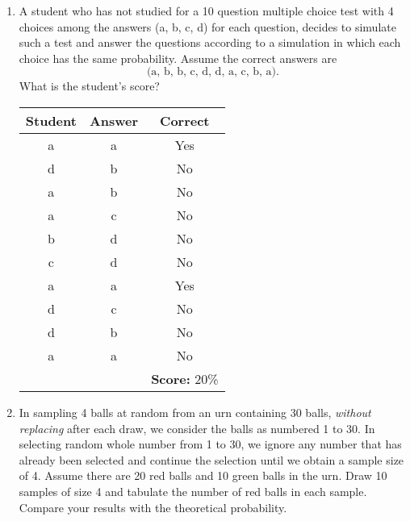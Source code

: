 \documentclass{hw}
\begin{document}
\begin{enumerate}
\newpage
\item A student who has not studied for a 10 question multiple choice test with 4 choices among the answers
(a, b, c, d) for each question, decides to simulate such a test and answer the questions according to a
simulation in which each choice has the same probability. Assume the correct answers are
\[\text{(a, b, b, c, d, d, a, c, b, a).}\]
What is the student's score?
\begin{center}
\begin{tabular}{c | c | c}
Student & Answer & Correct\\
\hline
a & a & Yes\\
d & b & No\\
a & b & No\\
a & c & No\\
b & d & No\\
c & d & No\\
a & a & Yes\\
d & c & No\\
d & b & No\\
a & a & No\\
\hline
& & \textbf{Score:} 20\%
\end{tabular}
\end{center}

\item In sampling 4 balls at random from an urn containing 30 balls, \textit{without replacing} after each
draw, we consider the balls as numbered 1 to 30. In selecting random whole number from 1 to 30, we ignore
any number that has already been selected and continue the selection until we obtain a sample size of 4.
Assume there are 20 red balls and 10 green balls in the urn. Draw 10 samples of size 4 and tabulate the
number of red balls in each sample. Compare your results with the theoretical probability.
\begin{quote}

\end{quote}


\end{enumerate}
\end{document}

